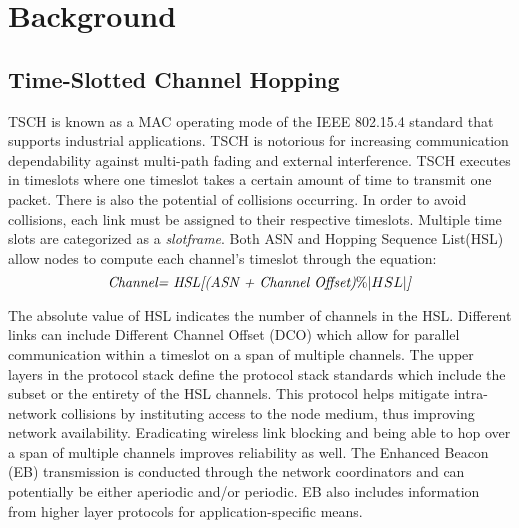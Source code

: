 \documentclass[acmsmall, authorversion]{acmart}
\begin{document}
\section{Background} 
\subsection{Time-Slotted Channel Hopping}

TSCH is known as a MAC operating mode of the IEEE 802.15.4 standard \cite{chang} that supports industrial applications. TSCH is notorious for increasing communication dependability against multi-path fading and external interference. TSCH executes in timeslots where one timeslot takes a certain amount of time to transmit one packet. There is also the potential of collisions occurring. In order to avoid collisions, each link must be assigned to their respective timeslots. Multiple time slots are categorized as a \emph{slotframe}. Both ASN and Hopping Sequence List(HSL) allow nodes to compute each channel's timeslot through the equation:
\\
\begin{equation}
\centerline{\emph{Channel= HSL[(ASN + Channel Offset)$  \%|HSL|$]}}
\end{equation}

The absolute value of HSL indicates the number of channels in the HSL. Different links can include Different Channel Offset (DCO) which allow for parallel communication within a timeslot on a span of multiple channels. The upper layers in the protocol stack define the protocol stack standards which include the subset or the entirety of the HSL channels. This protocol helps mitigate intra-network collisions by instituting access to the node medium, thus improving network availability. Eradicating wireless link blocking and being able to hop over a span of multiple channels improves reliability as well. The Enhanced Beacon (EB) transmission is conducted through the network coordinators and can potentially be either aperiodic and/or periodic. EB also includes information from higher layer protocols for application-specific means.
\end{document}
